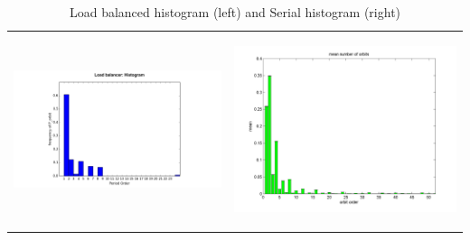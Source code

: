 \documentclass[12pt]{article}
\begin{document}
\begin {table}[H]
\begin{center}
\begin{tabular}{ p{8cm} p{8cm}}    
\begin{center}\includegraphics[scale=0.3]{hist}\end{center}&\begin{center} \includegraphics[scale=0.4]{serial_hist}\end{center}
\end{tabular}
\caption {Load balanced histogram (left) and Serial histogram (right)} \label{hist}
\end{center}
\end {table}
\end{document}
